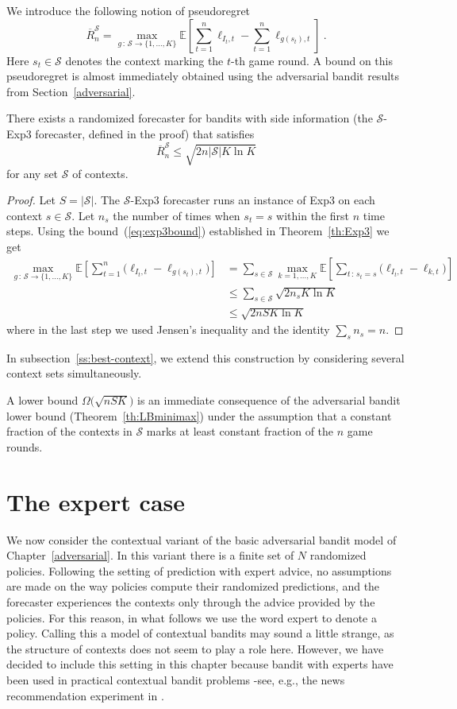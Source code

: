 \documentclass[11pt]{hackednow}
\newcommand{\E}{\mathbb{E}}
\newcommand{\cS}{\mathcal{S}}
\newcommand{\oR}{\overline{R}}
\newcommand{\oRS}{\oR^{\cS}}
\begin{document}
We introduce the following notion of pseudoregret
\[
	\oRS_n = \max_{g \,:\, \cS\to\{1,\dots,K\}} \E\left[ \sum_{t=1}^n \ell_{I_t,t} - \sum_{t=1}^n \ell_{g(s_t),t} \right]~.
\]
Here $s_t\in\cS$ denotes the context marking the $t$-th game round. A bound on this pseudoregret is almost immediately obtained using the adversarial bandit results from Section~\ref{adversarial}. 
%
\begin{theorem}
\label{th:context-simple}
There exists a randomized forecaster for bandits with side information (the $\cS$-Exp3 forecaster, defined in the proof) that satisfies
\[
	\oRS_n \le \sqrt{2n |\cS| K\ln K}
\]
for any set $\cS$ of contexts.
\end{theorem}
%
\begin{proof}
Let $S = |\cS|$.
The $\cS$-Exp3 forecaster runs an instance of Exp3 on each context $s\in\cS$. Let $n_s$ the number of times when $s_t=s$ within the first $n$ time steps. Using the bound~(\ref{eq:exp3bound}) established in Theorem~\ref{th:Exp3} we get
\begin{align*}
	\max_{g \,:\, \cS\to\{1,\dots,K\}} \E\left[ \sum_{t=1}^n \bigl(\ell_{I_t,t} - \ell_{g(s_t),t}\bigr) \right]
&=
	\sum_{s\in\cS} \max_{k=1,\dots,K} \E\left[ \sum_{t \,:\, s_t=s} \bigl(\ell_{I_t,t} - \ell_{k,t} \bigr)\right]
\\ &\le
	\sum_{s\in\cS} \sqrt{2 n_s K\ln K}
\\ &\le
	\sqrt{2 n S K\ln K}
\end{align*}
where in the last step we used Jensen's inequality and the identity $\sum_s n_s = n$.
\end{proof}
%
In subsection~\ref{ss:best-context}, we extend this construction by considering several context sets simultaneously.

A lower bound $\Omega\bigl(\sqrt{nSK}\bigl)$ is an immediate consequence of the adversarial bandit lower bound (Theorem~\ref{th:LBminimax}) under the assumption that a constant fraction of the contexts in $\cS$ marks at least constant fraction of the $n$ game rounds.


\section{The expert case}
\label{s:context-adv}
%
We now consider the contextual variant of the basic adversarial bandit model of Chapter~\ref{adversarial}. In this variant there is a finite set of $N$ randomized policies. Following the setting of prediction with expert advice, no assumptions are made on the way policies compute their randomized predictions, and the forecaster experiences the contexts only through the advice provided by the policies. For this reason, in what follows we use the word expert to denote a policy. Calling this a model of contextual bandits may sound a little strange, as the structure of contexts does not seem to play a role here. However, we have decided to include this setting in this chapter because bandit with experts have been used in practical contextual bandit problems -see, e.g., the news recommendation experiment in \cite{beygelzimer2010contextual}.
\end{document}
